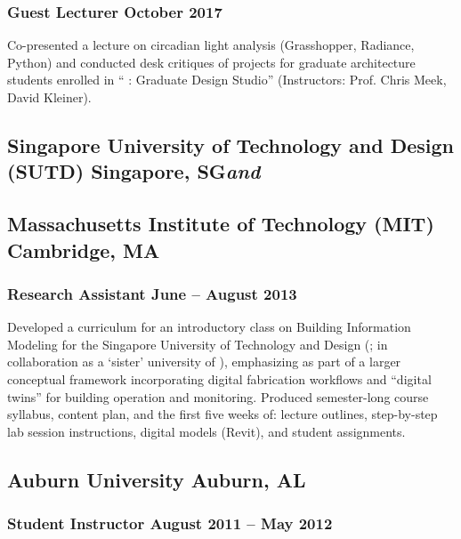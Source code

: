 \documentclass[letterpaper, oneside, 10pt]{article}
\begin{document}
\setlength{\pagetotal}{\pagetotal - 3em}

\subsubsection*{Guest Lecturer\DotSep{0.25em} October 2017}

Co-presented a lecture on circadian light analysis (Grasshopper, Radiance,
Python) and conducted desk critiques of projects for graduate architecture
students enrolled in `` : Graduate Design Studio''
(Instructors: Prof. Chris Meek, David Kleiner).

\subsection*{%
  Singapore University of Technology and Design (SUTD)%
  \DotSep{0.25em} Singapore, SG\DotSep{0.25em}\textit{and}%
}
\subsection*{%
  Massachusetts Institute of Technology (MIT)\DotSep{0.25em} Cambridge, MA%
}

\subsubsection*{Research Assistant\DotSep{0.25em} June -- August 2013}

Developed a curriculum for an introductory class on Building Information
Modeling  for the Singapore University of Technology and Design
(; in collaboration as a `sister' university of ), emphasizing
 as part of a larger conceptual framework incorporating digital
fabrication workflows and ``digital twins'' for building operation and
monitoring. Produced semester-long course syllabus, content plan, and the
first five weeks of: lecture outlines, step-by-step lab session instructions,
digital models (Revit), and student assignments.

\suppressfalse

\subsection*{Auburn University\DotSep{0.25em} Auburn, AL}

\subsubsection*{Student Instructor\DotSep{0.25em} August 2011 -- May 2012}
\end{document}
